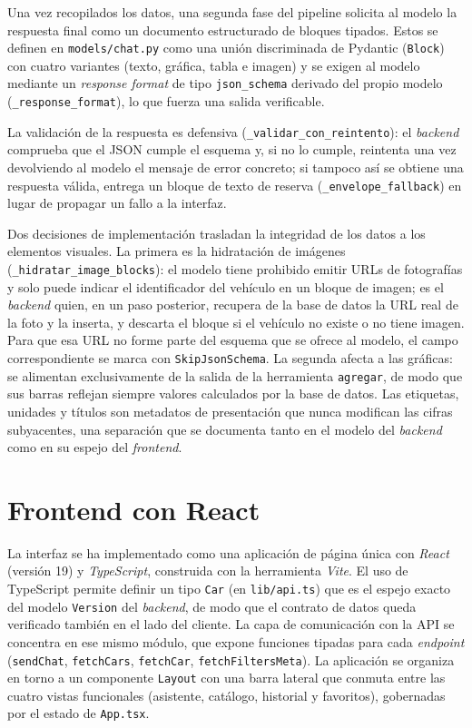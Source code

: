 Una vez recopilados los datos, una segunda fase del pipeline solicita al modelo la
respuesta final como un documento estructurado de bloques tipados. Estos se
definen en \texttt{models/chat.py} como una unión discriminada de Pydantic
(\texttt{Block}) con cuatro variantes (texto, gráfica, tabla e imagen) y se exigen
al modelo mediante un \emph{response format} de tipo \texttt{json\_schema} derivado
del propio modelo (\texttt{\_response\_format}), lo que fuerza una salida
verificable.

La validación de la respuesta es defensiva (\texttt{\_validar\_con\_reintento}): el
\emph{backend} comprueba que el JSON cumple el esquema y, si no lo cumple,
reintenta una vez devolviendo al modelo el mensaje de error concreto; si tampoco
así se obtiene una respuesta válida, entrega un bloque de texto de reserva
(\texttt{\_envelope\_fallback}) en lugar de propagar un fallo a la interfaz.

Dos decisiones de implementación trasladan la integridad de los datos a los
elementos visuales. La primera es la hidratación de imágenes
(\texttt{\_hidratar\_image\_blocks}): el modelo tiene prohibido emitir URLs de
fotografías y solo puede indicar el identificador del vehículo en un bloque de
imagen; es el \emph{backend} quien, en un paso posterior, recupera de la base de
datos la URL real de la foto y la inserta, y descarta el bloque si el vehículo no
existe o no tiene imagen. Para que esa URL no forme parte del esquema que se ofrece
al modelo, el campo correspondiente se marca con \texttt{SkipJsonSchema}. La
segunda afecta a las gráficas: se alimentan exclusivamente de la salida de la
herramienta \texttt{agregar}, de modo que sus barras reflejan siempre valores
calculados por la base de datos. Las etiquetas, unidades y títulos son metadatos de
presentación que nunca modifican las cifras subyacentes, una separación que se
documenta tanto en el modelo del \emph{backend} como en su espejo del
\emph{frontend}.

\section{Frontend con React}
\label{sec:impl-frontend}

La interfaz se ha implementado como una aplicación de página única con
\emph{React} (versión 19) y \emph{TypeScript}, construida con la herramienta
\emph{Vite}. El uso de TypeScript permite definir un tipo \texttt{Car} (en
\texttt{lib/api.ts}) que es el espejo exacto del modelo \texttt{Version} del
\emph{backend}, de modo que el contrato de datos queda verificado también en el
lado del cliente. La capa de comunicación con la API se concentra en ese mismo
módulo, que expone funciones tipadas para cada \emph{endpoint}
(\texttt{sendChat}, \texttt{fetchCars}, \texttt{fetchCar},
\texttt{fetchFiltersMeta}). La aplicación se organiza en torno a un componente
\texttt{Layout} con una barra lateral que conmuta entre las cuatro vistas
funcionales (asistente, catálogo, historial y favoritos), gobernadas por el
estado de \texttt{App.tsx}.

